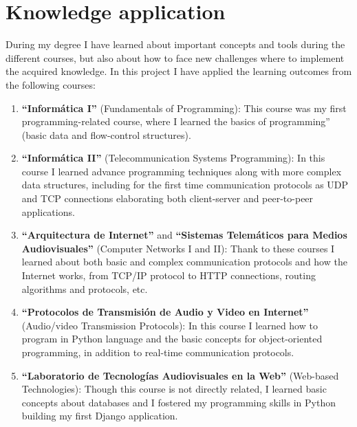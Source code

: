 \documentclass[a4paper, 12pt]{book}
\begin{document}
\section{Knowledge application}
\label{sec:knowledge-application}
During my degree I have learned about important concepts and tools during the different courses,
but also about how to face new challenges where to implement the acquired knowledge.
In this project I have applied the learning outcomes from the following courses:
\begin{enumerate}
  \item \textbf{``Informática I''} (Fundamentals of Programming): This course was my first programming-related course,
  where I learned the basics of programming'' (basic data and flow-control structures).
  \item \textbf{``Informática II''} (Telecommunication Systems Programming): In this course I learned advance programming
  techniques along with more complex data structures, including for the first time communication protocols as UDP and TCP connections
  elaborating both client-server and peer-to-peer applications.
  \item \textbf{``Arquitectura de Internet''} and \textbf{``Sistemas Telemáticos para Medios Audiovisuales''} (Computer Networks I and II):
  Thank to these courses I learned about both basic and complex communication protocols and how the Internet works,
  from TCP/IP protocol to HTTP connections, routing algorithms and protocols, etc.
  \item \textbf{``Protocolos de Transmisión de Audio y Video en Internet''} (Audio/video Transmission Protocols):
  In this course I learned how to program in Python language and the basic concepts for object-oriented programming, in
  addition to real-time communication protocols.
  \item \textbf{``Laboratorio de Tecnologías Audiovisuales en la Web''} (Web-based Technologies): Though this course is not directly
  related, I learned basic concepts about databases and I fostered my programming skills in Python building my first Django
  application.
\end{enumerate}
\end{document}
